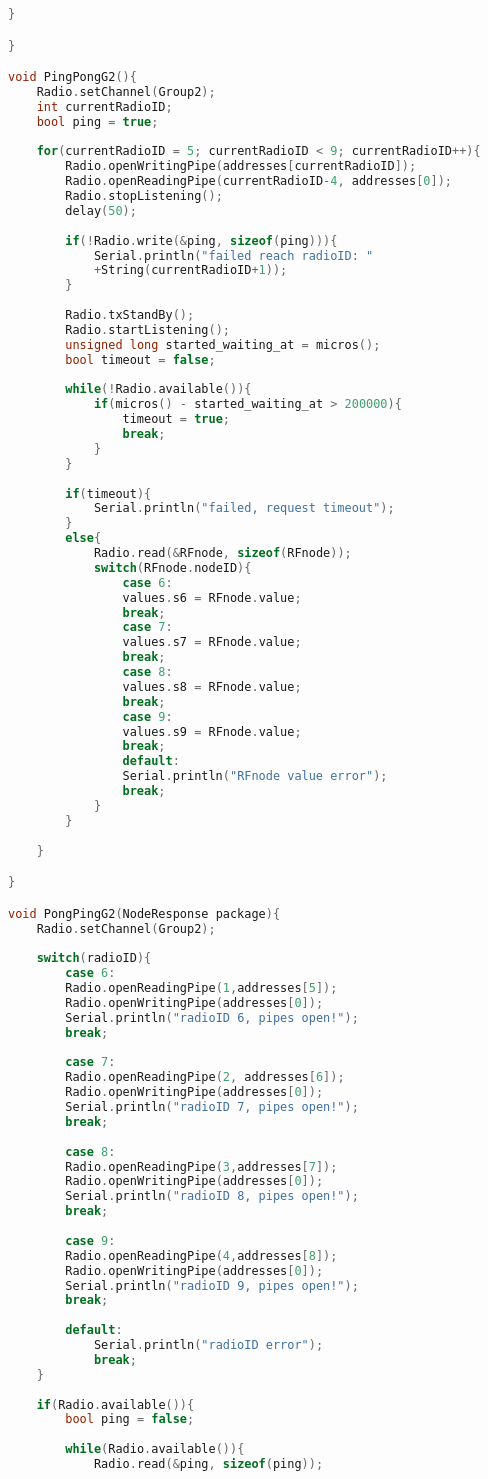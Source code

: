 \begin{lstlisting}[language=C++, caption={Firmware de nuestro prototipo en su versión 1.0}, captionpos=b, basicstyle=\small]
	}

}

void PingPongG2(){
	Radio.setChannel(Group2);
	int currentRadioID;
	bool ping = true;
	
	for(currentRadioID = 5; currentRadioID < 9; currentRadioID++){
		Radio.openWritingPipe(addresses[currentRadioID]);
		Radio.openReadingPipe(currentRadioID-4, addresses[0]);
		Radio.stopListening();
		delay(50);
		
		if(!Radio.write(&ping, sizeof(ping))){
			Serial.println("failed reach radioID: "
			+String(currentRadioID+1));
		}
		
		Radio.txStandBy();
		Radio.startListening();
		unsigned long started_waiting_at = micros();
		bool timeout = false;
		
		while(!Radio.available()){
			if(micros() - started_waiting_at > 200000){
				timeout = true;
				break;
			}
		}
		
		if(timeout){
			Serial.println("failed, request timeout");
		}
		else{
			Radio.read(&RFnode, sizeof(RFnode));
			switch(RFnode.nodeID){
				case 6:
				values.s6 = RFnode.value;
				break;
				case 7:
				values.s7 = RFnode.value;
				break;
				case 8:
				values.s8 = RFnode.value;
				break;
				case 9:
				values.s9 = RFnode.value;
				break;
				default:
				Serial.println("RFnode value error");
				break;
			}
		}
		
	}

}

void PongPingG2(NodeResponse package){
	Radio.setChannel(Group2);
	
	switch(radioID){
		case 6:
		Radio.openReadingPipe(1,addresses[5]);
		Radio.openWritingPipe(addresses[0]);
		Serial.println("radioID 6, pipes open!");
		break;
		
		case 7:
		Radio.openReadingPipe(2, addresses[6]);
		Radio.openWritingPipe(addresses[0]);
		Serial.println("radioID 7, pipes open!");
		break;
		
		case 8:
		Radio.openReadingPipe(3,addresses[7]);
		Radio.openWritingPipe(addresses[0]);
		Serial.println("radioID 8, pipes open!");
		break;
		
		case 9:
		Radio.openReadingPipe(4,addresses[8]);
		Radio.openWritingPipe(addresses[0]);
		Serial.println("radioID 9, pipes open!");
		break;
		
		default:
			Serial.println("radioID error");
			break;
	}
	
	if(Radio.available()){
		bool ping = false;
		
		while(Radio.available()){
			Radio.read(&ping, sizeof(ping));
		

\end{lstlisting}
